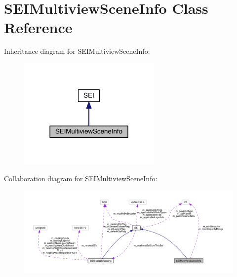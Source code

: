 \hypertarget{class_s_e_i_multiview_scene_info}{}\section{S\+E\+I\+Multiview\+Scene\+Info Class Reference}
\label{class_s_e_i_multiview_scene_info}


Inheritance diagram for S\+E\+I\+Multiview\+Scene\+Info\+:
\nopagebreak
\begin{figure}[H]
\begin{center}
\leavevmode
\includegraphics[width=198pt]{d7/dbb/class_s_e_i_multiview_scene_info__inherit__graph}
\end{center}
\end{figure}


Collaboration diagram for S\+E\+I\+Multiview\+Scene\+Info\+:
\nopagebreak
\begin{figure}[H]
\begin{center}
\leavevmode
\includegraphics[width=350pt]{d4/d2c/class_s_e_i_multiview_scene_info__coll__graph}
\end{center}
\end{figure}
